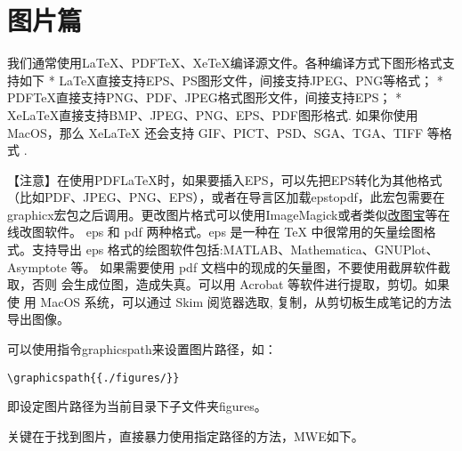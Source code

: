 %
%
%
%

\section{图片篇}



我们通常使用LaTeX、PDFTeX、XeTeX编译源文件。各种编译方式下图形格式支持如下
* LaTeX直接支持EPS、PS图形文件，间接支持JPEG、PNG等格式； *
PDFTeX直接支持PNG、PDF、JPEG格式图形文件，间接支持EPS； *
XeLaTeX直接支持BMP、JPEG、PNG、EPS、PDF图形格式. 如果你使用MacOS，那么
XeLaTeX 还会支持 GIF、PICT、PSD、SGA、TGA、TIFF 等格式 .

【注意】在使用PDFLaTeX时，如果要插入EPS，可以先把EPS转化为其他格式（比如PDF、JPEG、PNG、EPS），或者在导言区加载epstopdf，此宏包需要在graphicx宏包之后调用。更改图片格式可以使用ImageMagick或者类似\href{http://www.gaitubao.com}{改图宝}等在线改图软件。
eps 和 pdf 两种格式。eps 是一种在 TeX 中很常用的矢量绘图格式。支持导出
eps 格式的绘图软件包括:MATLAB、Mathematica、GNUPlot、 Asymptote 等。
如果需要使用 pdf 文档中的现成的矢量图，不要使用截屏软件截取，否则
会生成位图，造成失真。可以用 Acrobat 等软件进行提取，剪切。如果使 用
MacOS 系统，可以通过 Skim 阅览器选取,
复制，从剪切板生成笔记的方法导出图像。



可以使用指令graphicspath来设置图片路径，如：
\begin{verbatim}
\graphicspath{{./figures/}}
\end{verbatim}

即设定图片路径为当前目录下子文件夹figures。



关键在于找到图片，直接暴力使用指定路径的方法，MWE如下。


